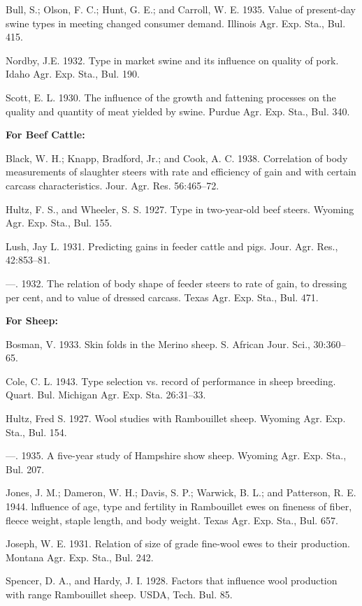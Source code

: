 \begin{hangparas}{0.5in}{1}%
Bull, S.; Olson, F. C.; Hunt, G. E.; and Carroll, W. E. 1935. Value of present-day
swine types in meeting changed consumer demand. Illinois Agr. Exp. Sta.,
Bul. 415.

Nordby, J.E. 1932. Type in market swine and its influence on quality of pork. Idaho
Agr. Exp. Sta., Bul. 190.

Scott, E. L. 1930. The influence of the growth and fattening processes on the quality
and quantity of meat yielded by swine. Purdue Agr. Exp. Sta., Bul. 340.
\end{hangparas}

\noindent
\textbf{For Beef Cattle:}

\begin{hangparas}{0.5in}{1}%
Black, W. H.; Knapp, Bradford, Jr.; and Cook, A. C. 1938. Correlation of body
measurements of slaughter steers with rate and efficiency of gain and with
certain carcass characteristics. Jour. Agr. Res. 56:465--72.

Hultz, F. S., and Wheeler, S. S. 1927. Type in two-year-old beef steers. Wyoming
Agr. Exp. Sta., Bul. 155.

Lush, Jay L. 1931. Predicting gains in feeder cattle and pigs. Jour. Agr. Res.,
42:853--81.

---. 1932. The relation of body shape of feeder steers to rate of gain, to
dressing per cent, and to value of dressed carcass. Texas Agr. Exp. Sta., Bul.
471.
\end{hangparas}

\noindent
\textbf{For Sheep:}

\begin{hangparas}{0.5in}{1}%
Bosman, V. 1933. Skin folds in the Merino sheep. S. African Jour. Sci., 30:360--65.

Cole, C. L. 1943. Type selection vs. record of performance in sheep breeding. Quart.
Bul. Michigan Agr. Exp. Sta. 26:31--33.

Hultz, Fred S. 1927. Wool studies with Rambouillet sheep. Wyoming Agr. Exp. Sta.,
Bul. 154.

---. 1935. A five-year study of Hampshire show sheep. Wyoming Agr. Exp.
Sta., Bul. 207.

Jones, J. M.; Dameron, W. H.; Davis, S. P.; Warwick, B. L.; and Patterson, R. E.
1944. lnfluence of age, type and fertility in Rambouillet ewes on fineness
of fiber, fleece weight, staple length, and body weight. Texas Agr. Exp. Sta.,
Bul. 657.

Joseph, W. E. 1931. Relation of size of grade fine-wool ewes to their production.
Montana Agr. Exp. Sta., Bul. 242.

Spencer, D. A., and Hardy, J. I. 1928. Factors that influence wool production with
range Rambouillet sheep. USDA, Tech. Bul. 85.
\end{hangparas}
